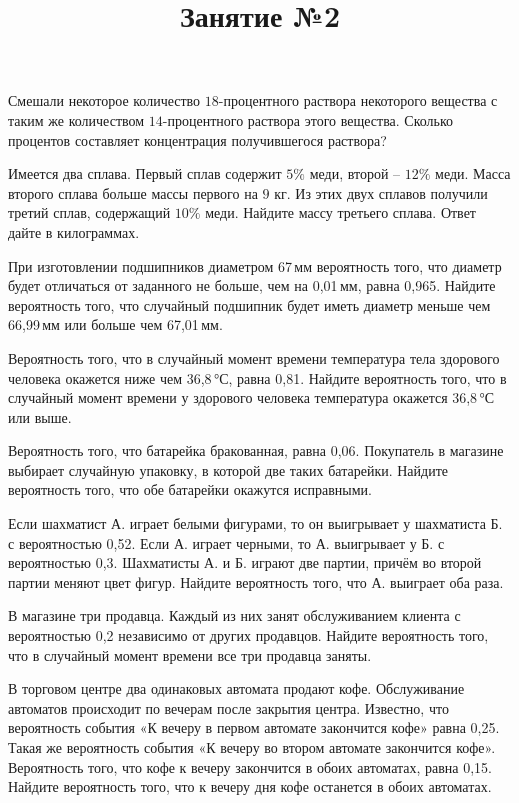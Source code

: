 \begin{listofex}
	\item Смешали некоторое количество \( 18 \)-процентного раствора некоторого вещества с таким же количеством \( 14 \)-процентного раствора этого вещества. Сколько процентов составляет концентрация получившегося раствора?
	\item Имеется два сплава. Первый сплав содержит \( 5\% \) меди, второй – \( 12\% \) меди. Масса второго сплава больше массы первого на \( 9 \) кг. Из этих двух сплавов получили третий сплав, содержащий \( 10\% \) меди. Найдите массу третьего сплава. Ответ дайте в килограммах.
\end{listofex}
\newpage
\title{Занятие №2}
\begin{listofex}
	\item При изготовлении подшипников диаметром 67 мм вероятность того, что диаметр будет отличаться от заданного не больше, чем на 0,01 мм, равна 0,965. Найдите вероятность того, что случайный подшипник будет иметь диаметр меньше чем 66,99 мм или больше чем 67,01 мм.
	\item Вероятность того, что в случайный момент времени температура тела здорового человека окажется ниже чем 36,8 °С, равна 0,81. Найдите вероятность того, что в случайный момент времени у здорового человека температура окажется 36,8 °С или выше.
	\item Вероятность того, что батарейка бракованная, равна 0,06. Покупатель в магазине выбирает случайную упаковку, в которой две таких батарейки. Найдите вероятность того, что обе батарейки окажутся исправными.
	\item Если шахматист А. играет белыми фигурами, то он выигрывает у шахматиста Б. с вероятностью 0,52. Если А. играет черными, то А. выигрывает у Б. с вероятностью 0,3. Шахматисты А. и Б. играют две партии, причём во второй партии меняют цвет фигур. Найдите вероятность того, что А. выиграет оба раза.
	\item В магазине три продавца. Каждый из них занят обслуживанием клиента с вероятностью 0,2 независимо от других продавцов. Найдите вероятность того, что в случайный момент времени все три продавца заняты.
	\item В торговом центре два одинаковых автомата продают кофе. Обслуживание автоматов происходит по вечерам после закрытия центра. Известно, что вероятность события «К вечеру в первом автомате закончится кофе» равна 0,25. Такая же вероятность события «К вечеру во втором автомате закончится кофе». Вероятность того, что кофе к вечеру закончится в обоих автоматах, равна 0,15. Найдите вероятность того, что к вечеру дня кофе останется в обоих автоматах.

\end{listofex}
